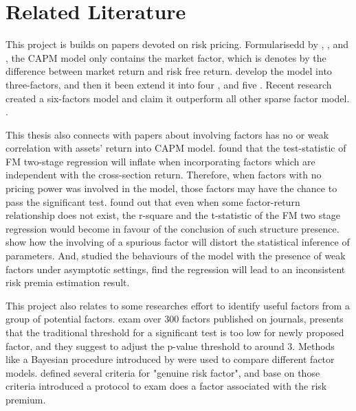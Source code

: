 	\section{Related Literature}

This project is builds on papers devoted on  risk pricing.
Formularisedd by , , and , the CAPM model only contains the market factor, which is denotes by the difference between market return and risk free return.
 develop the model into three-factors, and then it been extend it into four \cite{Carhart1997}, and five \cite{Fama2015}.
Recent research created a six-factors model and claim it outperform all other sparse factor model. \cite{Kelly2019}.

This thesis also connects with papers about involving factors has no or weak correlation with assets' return into CAPM model.
 found that the test-statistic of FM two-stage regression  \cite{Fama1973} will inflate when incorporating factors which are independent with the cross-section return.
Therefore, when factors with no pricing power was involved in the model, those factors may have the chance to pass the significant test.
 found out that even when some factor-return relationship does not exist, the r-square and the t-statistic of the FM two stage regression would become in favour of the conclusion of such structure presence. 
 show how the involving of a spurious factor will distort the statistical inference of parameters.
And,  studied the behaviours of the model with the presence of weak factors under asymptotic settings, find the regression will lead to an inconsistent risk premia estimation result.
	
	
This project also relates to some researches effort to identify useful factors from a group of potential factors.
 exam over 300 factors published on journals, presents that the traditional threshold for a significant test is too low for newly proposed factor, and they suggest to adjust the p-value threshold to around 3. 
Methods like a Bayesian procedure introduced by  were used to compare different factor models.
 defined several criteria for "genuine risk factor", and base on those criteria introduced a protocol to exam does a factor associated with the risk premium.

